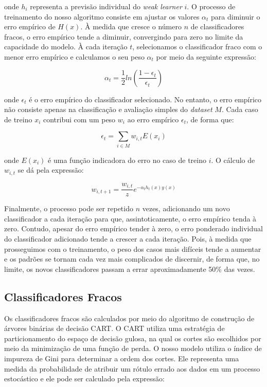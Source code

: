 \documentclass{article}
\begin{document}
onde $ h_i $ representa a previsão individual do \textit{weak learner} $ i $. O processo de treinamento 
do nosso algoritmo consiste em ajustar os valores $ \alpha_t $ para 
diminuir o erro empírico de $ H(x) $. À medida que cresce o número $ n $ de classificadores fracos,
o erro empírico tende a diminuir, convergindo para zero no limite da capacidade do modelo. À
cada iteração $ t $, selecionamos o classificador fraco com o menor erro empírico e 
calculamos o seu peso $ \alpha_t $ por meio da seguinte expressão:

\[
\alpha_t = \frac{1}{2} ln\left(\frac{1 - \epsilon_t}{\epsilon_t}\right)
\]

onde $ \epsilon_t $ é o erro empírico do classificador selecionado. No entanto, o erro empírico não
consiste apenas na classificação e avaliação simples do \textit{dataset} $ M $. Cada caso de treino 
$ x_i $ contribui com um peso $ w_i $ ao erro empírico $ \epsilon_t $, de forma que:

\[
\epsilon_t = \sum_{i \in M} w_{i,t} E(x_i)
\]

onde $ E(x_i) $ é uma função indicadora do erro no caso de treino $ i $. O cálculo de $ w_{i,t} $ se dá pela expressão:

\[
w_{i,t+1} = \frac{w_{i,t}}{z} e^{-\alpha_t h_t(x) y(x)}
\]

Finalmente, o processo pode ser repetido $ n $ vezes, adicionando um novo classificador a cada iteração
para que, assintoticamente, o erro empírico tenda à zero. Contudo, apesar do erro empírico tender à
zero, o erro ponderado individual do classificador adicionado tende a crescer a cada iteração. Pois,
à medida que prosseguimos com o treinamento, o peso dos casos mais difíceis tende a aumentar
e os padrões se tornam cada vez mais complicados de discernir, de forma que, no limite,
os novos classificadores passam a errar aproximadamente 50\% das vezes.

\subsection{Classificadores Fracos}

Os classificadores fracos são calculados por meio do algoritmo de construção de árvores 
binárias de decisão CART. O CART utiliza uma estratégia de particionamento do espaço de decisão 
gulosa, na qual os cortes são escolhidos por meio da minimização de uma função de perda. O
nosso modelo utiliza o índice de impureza de Gini para determinar a ordem dos cortes. Ele representa
uma medida da probabilidade de atribuir um rótulo errado aos dados em um processo estocástico e
ele pode ser calculado pela expressão:
\end{document}
